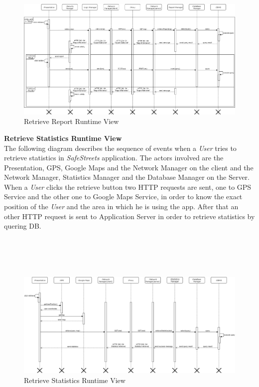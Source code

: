 \documentclass{article}
\begin{document}
\begin{figure}[H]
    \centering
    \includegraphics[scale=0.3]{img/sequence_diagrams/retrieve_report.png}
    \caption{Retrieve Report Runtime View}
\end{figure}  
\clearpage
\textbf{Retrieve Statistics Runtime View}\\
The following diagram describes the sequence of events when a \textit{User} tries to retrieve statistics in
\textit{SafeStreets} application. The actors involved are the Presentation, GPS, Google Maps and the Network 
Manager on the client and the Network Manager, Statistics Manager and the Database Manager on the Server.
When a \textit{User} clicks the retrieve button two HTTP requests are sent, one to GPS Service and the other
one to Google Maps Service, in order to know the exact position of the \textit{User} and the area in which he is
using the app. After that an other HTTP request is sent to Application Server in order to retrieve statistics by 
quering DB. 
\\
\\
\\
\\
\\
\begin{figure}[H]
    \centering
    \includegraphics[scale=0.3]{img/sequence_diagrams/retrieve_statistics.png}
    \caption{Retrieve Statistics Runtime View}
\end{figure}  
\clearpage
\end{document}
